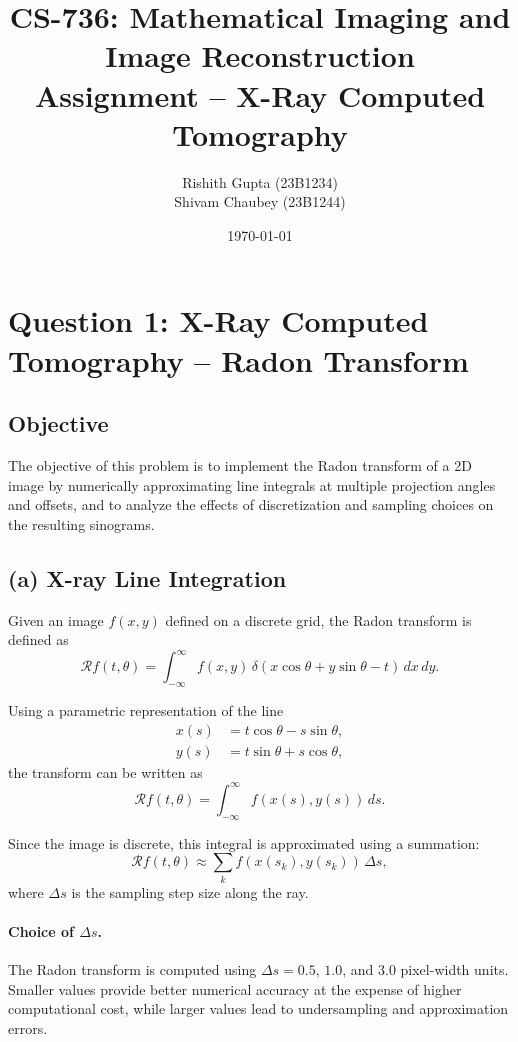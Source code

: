 \documentclass[11pt,a4paper]{article}
\title{\textbf{CS-736: Mathematical Imaging and Image Reconstruction}\\
Assignment -- X-Ray Computed Tomography}
\author{
Rishith Gupta (23B1234)
\\
Shivam Chaubey (23B1244)
}
\date{\today}
\begin{document}
\maketitle
\thispagestyle{empty}
\newpage

\section*{Question 1: X-Ray Computed Tomography -- Radon Transform}

\subsection*{Objective}

The objective of this problem is to implement the Radon transform of a 2D image by numerically approximating line integrals at multiple projection angles and offsets, and to analyze the effects of discretization and sampling choices on the resulting sinograms.

\vspace{0.3cm}

\subsection*{(a) X-ray Line Integration}

Given an image $f(x,y)$ defined on a discrete grid, the Radon transform is defined as
\[
\mathcal{R}f(t,\theta)
=
\int_{-\infty}^{\infty}
f(x,y)\,
\delta(x\cos\theta + y\sin\theta - t)\,dx\,dy.
\]

Using a parametric representation of the line
\[
\begin{aligned}
x(s) &= t\cos\theta - s\sin\theta, \\
y(s) &= t\sin\theta + s\cos\theta,
\end{aligned}
\]
the transform can be written as
\[
\mathcal{R}f(t,\theta)
=
\int_{-\infty}^{\infty}
f(x(s), y(s))\,ds.
\]

Since the image is discrete, this integral is approximated using a summation:
\[
\mathcal{R}f(t,\theta)
\approx
\sum_{k} f(x(s_k), y(s_k))\,\Delta s,
\]
where $\Delta s$ is the sampling step size along the ray.

\paragraph{Choice of $\Delta s$.}
The Radon transform is computed using $\Delta s = 0.5$, $1.0$, and $3.0$ pixel-width units. Smaller values provide better numerical accuracy at the expense of higher computational cost, while larger values lead to undersampling and approximation errors.
\end{document}
